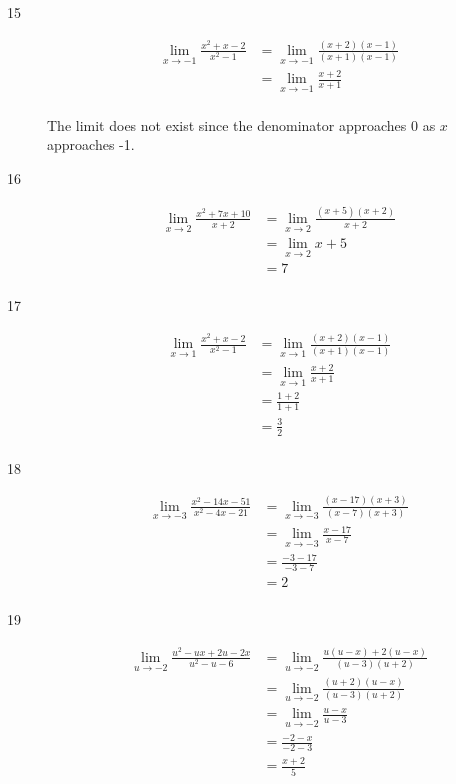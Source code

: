 \documentclass{exam}
\begin{document}
\begin{description}
\item[15]
\begin{align*}
  \lim_{x \to -1} \frac{x^2 + x - 2}{x^2 - 1} &= \lim_{x \to -1} \frac{(x+2)(x-1)}{(x+1)(x-1)} \\
    &= \lim_{x \to -1} \frac{x+2}{x+1} \\
\end{align*}

The limit does not exist since the denominator approaches 0 as $x$ approaches -1.

\item[16]
\begin{align*}
  \lim_{x \to 2} \frac{x^2 + 7x + 10}{x+2} &= \lim_{x \to 2} \frac{(x+5)(x+2)}{x+2} \\
   &= \lim_{x \to 2} x+5 \\
   &= 7 \\
\end{align*}

\item[17]
\begin{align*}
  \lim_{x \to 1} \frac{x^2 + x - 2}{x^2 - 1} &= \lim_{x \to 1} \frac{(x+2)(x-1)}{(x+1)(x-1)} \\
   &= \lim_{x \to 1} \frac{x+2}{x+1} \\
   &= \frac{1+2}{1+1} \\
   &= \frac{3}{2} \\
\end{align*}

\item[18]
\begin{align*}
  \lim_{x \to -3} \frac{x^2 - 14x - 51}{x^2 - 4x - 21} &= \lim_{x \to -3} \frac{(x-17)(x+3)}{(x-7)(x+3)} \\
   &= \lim_{x \to -3} \frac{x-17}{x-7} \\
   &=  \frac{-3-17}{-3 - 7} \\
   &= 2 \\
\end{align*}

\item[19]
\begin{align*}
  \lim_{u \to -2} \frac{u^2 - ux + 2u - 2x}{u^2 - u - 6} &= \lim_{u \to -2} \frac{u(u - x) + 2(u - x)}{(u-3)(u+2)} \\
   &= \lim_{u \to -2} \frac{(u+2)(u - x)}{(u-3)(u+2)} \\
   &= \lim_{u \to -2} \frac{u - x}{u-3} \\
   &= \frac{-2 - x}{-2-3} \\
   &= \frac{x + 2}{5} \\
\end{align*}


\end{description}
\end{document}
